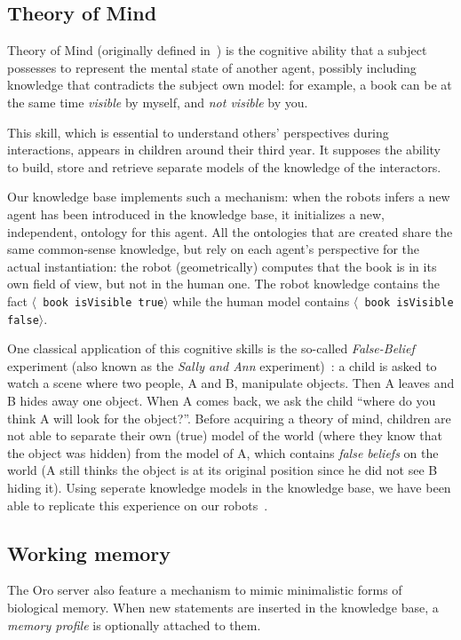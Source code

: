 \documentclass[letterpaper, 10 pt, conference]{ieeeconf}  %
\newcommand{\stmt}[1]{{\footnotesize \tt $\langle$ #1\relax$\rangle$}}
\begin{document}
\subsection{Theory of Mind}
\label{sect|tom}

Theory of Mind (originally defined in~\cite{Premack1978}) is the cognitive
ability that a subject possesses to represent the mental state of another
agent, possibly including knowledge that contradicts the subject own model: for
example, a book can be at the same time \emph{visible} by myself, and \emph{not
visible} by you.

This skill, which is essential to understand others' perspectives during
interactions, appears in children around their third year. It supposes the ability to build, store and retrieve separate models of the knowledge of the interactors.

Our knowledge base implements such a mechanism: when the robots infers a new
agent has been introduced in the knowledge base, it initializes a new,
independent, ontology for this agent. All the ontologies that are created share
the same common-sense knowledge, but rely on each agent's perspective for the
actual instantiation: the robot (geometrically) computes that the book is in
its own field of view, but not in the human one. The robot knowledge contains
the fact \stmt{book isVisible true} while the human model contains \stmt{book
isVisible false}.

One classical application of this cognitive skills is the so-called
\emph{False-Belief} experiment (also known as the \emph{Sally and Ann}
experiment)~\cite{Leslie2000}: a child is asked to watch a scene where two
people, A and B, manipulate objects. Then A leaves and B hides away one
object. When A comes back, we ask the child ``where do you think A will
look for the object?''. Before acquiring a theory of mind, children are not
able to separate their own (true) model of the world (where they know that
the object was hidden) from the model of A, which contains \emph{false
beliefs} on the world (A still thinks the object is at its original
position since he did not see B hiding it). Using seperate knowledge models
in the knowledge base, we have been able to replicate this experience on
our robots~\cite{Warnier2012a}.

\subsection{Working memory}

The {\sc Oro} server also feature a mechanism to mimic minimalistic forms of
biological memory.  When new statements are inserted in the knowledge base, a
\emph{memory profile} is optionally attached to them.
\end{document}
